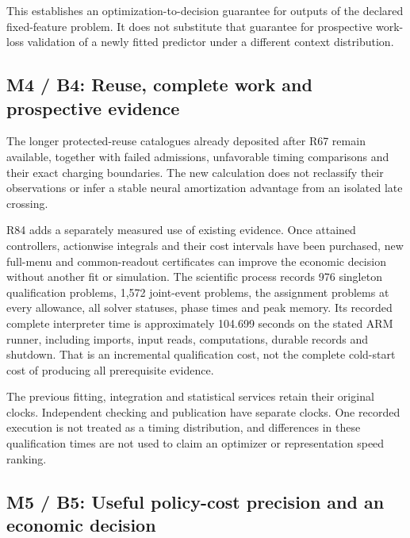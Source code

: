 \documentclass[ecta,nameyear,draft]{econsocart}
\begin{document}
This establishes an optimization-to-decision guarantee for outputs of
the declared fixed-feature problem. It does not substitute that
guarantee for prospective work-loss validation of a newly fitted
predictor under a different context distribution.

\hypertarget{m4-b4-reuse-complete-work-and-prospective-evidence}{%
\subsection{M4 / B4: Reuse, complete work and prospective
evidence}\label{m4-b4-reuse-complete-work-and-prospective-evidence}}

The longer protected-reuse catalogues already deposited after R67 remain
available, together with failed admissions, unfavorable timing
comparisons and their exact charging boundaries. The new calculation
does not reclassify their observations or infer a stable neural
amortization advantage from an isolated late crossing.

R84 adds a separately measured use of existing evidence. Once attained
controllers, actionwise integrals and their cost intervals have been
purchased, new full-menu and common-readout certificates can improve the
economic decision without another fit or simulation. The scientific
process records 976 singleton qualification problems, 1,572 joint-event
problems, the assignment problems at every allowance, all solver
statuses, phase times and peak memory. Its recorded complete interpreter
time is approximately 104.699 seconds on the stated ARM runner,
including imports, input reads, computations, durable records and
shutdown. That is an incremental qualification cost, not the complete
cold-start cost of producing all prerequisite evidence.

The previous fitting, integration and statistical services retain their
original clocks. Independent checking and publication have separate
clocks. One recorded execution is not treated as a timing distribution,
and differences in these qualification times are not used to claim an
optimizer or representation speed ranking.

\hypertarget{m5-b5-useful-policy-cost-precision-and-an-economic-decision}{%
\subsection{M5 / B5: Useful policy-cost precision and an economic
decision}\label{m5-b5-useful-policy-cost-precision-and-an-economic-decision}}
\end{document}
